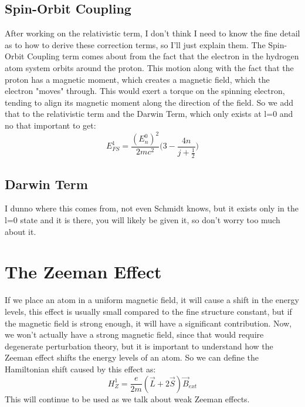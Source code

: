 \documentclass[garamond]{article}
\begin{document}
\subsection{Spin-Orbit Coupling}
After working on the relativistic term, I don't think I need to know the fine detail as to how to derive these correction terms, so I'll just explain them. The Spin-Orbit Coupling term comes about from the fact that the electron in the hydrogen atom system orbits around the proton. This motion along with the fact that the proton has a magnetic moment, which creates a magnetic field, which the electron "moves" through. This would exert a torque on the spinning electron, tending to align its magnetic moment along the direction of the field. So we add that to the relativistic term and the Darwin Term, which only exists at l=0 and no that important to get:
\begin{equation}
E_{FS}^1=\frac{(E_n^0)^2}{2mc^2}\bigg(3-\frac{4n}{j+\frac{1}{2}}\bigg)
\end{equation}

\subsection{Darwin Term}
I dunno where this comes from, not even Schmidt knows, but it exists only in the l=0 state and it is there, you will likely be given it, so don't worry too much about it.

\section{The Zeeman Effect}
If we place an atom in a uniform magnetic field, it will cause a shift in the energy levels, this effect is usually small compared to the fine structure constant, but if the magnetic field is strong enough, it will have a significant contribution. Now, we won't actually have a strong magnetic field, since that would require degenerate perturbation theory, but it is important to understand how the Zeeman effect shifts the energy levels of an atom. So we can define the Hamiltonian shift caused by this effect as:
\begin{equation}
H_Z^1=\frac{e}{2m}(\vec{L}+2\vec{S})\vec{B}_{ext}
\end{equation}
This will continue to be used as we talk about weak Zeeman effects.
\end{document}
